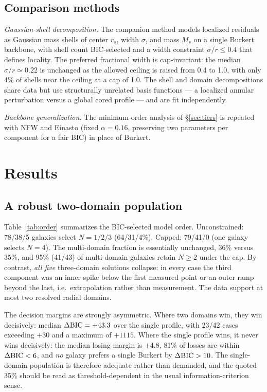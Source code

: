 \documentclass[twocolumn]{aastex631}
\newcommand{\dbic}{\Delta{\rm BIC}}
\begin{document}
\subsection{Comparison methods}

\emph{Gaussian-shell decomposition.} The companion method models localized
residuals as Gaussian mass shells of center $r_s$, width $\sigma$, and mass
$M_s$ on a single Burkert backbone, with shell count BIC-selected and a width
constraint $\sigma/r \le 0.4$ that defines locality. The preferred fractional
width is cap-invariant: the median $\sigma/r \simeq 0.22$ is unchanged as the
allowed ceiling is raised from 0.4 to 1.0, with only 4\% of shells near the
ceiling at a cap of 1.0. The shell and domain decompositions share data but
use structurally unrelated basis functions --- a localized annular perturbation
versus a global cored profile --- and are fit independently.

\emph{Backbone generalization.} The minimum-order analysis of
\S\ref{sec:tiers} is repeated with NFW and Einasto (fixed $\alpha = 0.16$,
preserving two parameters per component for a fair BIC) in place of Burkert.

\section{Results} \label{sec:results}

\subsection{A robust two-domain population} \label{sec:twodomain}

Table~\ref{tab:order} summarizes the BIC-selected model order.
Unconstrained: 78/38/5 galaxies select $N = 1/2/3$ (64/31/4\%). Capped:
79/41/0 (one galaxy selects $N = 4$). The multi-domain fraction is
essentially unchanged, 36\% versus 35\%, and 95\% (41/43) of multi-domain
galaxies retain $N \ge 2$ under the cap. By contrast, \emph{all five}
three-domain solutions collapse: in every case the third component was an
inner spike below the first measured point or an outer ramp beyond the last,
i.e.\ extrapolation rather than measurement. The data support at most two
resolved radial domains.

The decision margins are strongly asymmetric. Where two domains win, they win
decisively: median $\dbic = +43.3$ over the single profile, with 23/42 cases
exceeding $+30$ and a maximum of $+1115$. Where the single profile wins, it
never wins decisively: the median losing margin is $+4.8$, 81\% of losses are
within $\dbic < 6$, and \emph{no} galaxy prefers a single Burkert by
$\dbic > 10$. The single-domain population is therefore adequate rather than
demanded, and the quoted 35\% should be read as threshold-dependent in the
usual information-criterion sense.
\end{document}
